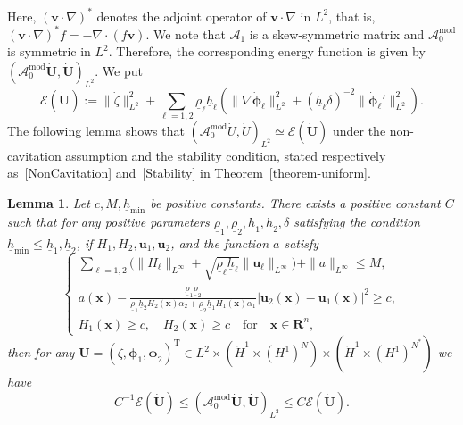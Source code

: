 \documentclass[11pt,leqno]{article}
\newtheorem{lemma}[theorem]{\bf Lemma}
\numberwithin{equation}{section}
\numberwithin{figure}{section}
\begin{document}
%
Here, $(\bm{v}\cdot\nabla)^*$ denotes the adjoint operator of $\bm{v}\cdot\nabla$ in $L^2$, that is, 
$(\bm{v}\cdot\nabla)^*f=-\nabla\cdot(f\bm{v})$. 
We note that $\mathscr{A}_1$ is a skew-symmetric matrix and $\mathscr{A}_0^\mathrm{mod}$ is symmetric in $L^2$. 
Therefore, the corresponding energy function is given by 
$(\mathscr{A}_0^\mathrm{mod}\dot{\bm{U}},\dot{\bm{U}})_{L^2}$. 
We put 
%
\begin{equation}\label{def-E}
\mathscr{E}(\dot{\bm{U}}) := \|\dot{\zeta}\|_{L^2}^2
 + \sum_{\ell=1,2}\underline{\rho}_\ell\underline{h}_\ell( \|\nabla\dot{\bm{\phi}}_\ell\|_{L^2}^2
  + (\underline{h}_\ell\delta)^{-2}\|\dot{\bm{\phi}}_\ell'\|_{L^2}^2 ).
\end{equation}
%
The following lemma shows that $(\mathscr{A}_0^\mathrm{mod}\dot{U},\dot{U})_{L^2} \simeq \mathscr{E}(\dot{\bm{U}})$ 
under
the non-cavitation assumption and the stability condition, 
stated respectively as~\eqref{NonCavitation} and~\eqref{Stability} in Theorem~\ref{theorem-uniform}. 


\begin{lemma}\label{L.A0-coercive}
Let $c, M, \underline{h}_\mathrm{min}$ be positive constants. 
There exists a positive constant $C$ such that for any positive parameters 
$\underline{\rho}_1,\underline{\rho}_2,\underline{h}_1,\underline{h}_2,\delta$ satisfying the condition 
$\underline{h}_\mathrm{min} \leq \underline{h}_1,\underline{h}_2$, if $H_1,H_2,\bm{u}_1,\bm{u}_2$, and the function $a$ satisfy 
%
\begin{equation}\label{conditions-linear1}
\begin{cases}
 \displaystyle
 \sum_{\ell=1,2}\bigl( \|H_\ell\|_{L^\infty} + \sqrt{ \underline{\rho}_\ell\underline{h}_\ell }
  \|\bm{u}_\ell\|_{L^\infty} \bigr) + \|a\|_{L^\infty} \leq M, \\
 \displaystyle
 a(\bm{x}) - \frac{ \underline{\rho}_1\underline{\rho}_2 }{ \underline{\rho}_1\underline{h}_2H_2(\bm{x})\alpha_2
  + \underline{\rho}_2\underline{h}_1H_1(\bm{x})\alpha_1 }|\bm{u}_2(\bm{x})-\bm{u}_1(\bm{x})|^2 \geq c, \\
 H_1(\bm{x}) \geq c, \quad H_2(\bm{x}) \geq c \quad\mbox{for}\quad \bm{x}\in\mathbf{R}^n,
\end{cases}
\end{equation}
%
then for any $\dot{\bm{U}} = (\dot{\zeta},\dot{\bm{\phi}}_1,\dot{\bm{\phi}}_2)^\mathrm{T} \in 
L^2\times(\mathring{H}^1\times(H^1)^N)\times(\mathring{H}^1\times(H^1)^{N^*})$ we have 
%
\[
C^{-1}\mathscr{E}(\dot{\bm{U}}) \leq (\mathscr{A}_0^\mathrm{mod}\dot{\bm{U}},\dot{\bm{U}})_{L^2}
\leq C\mathscr{E}(\dot{\bm{U}}). 
\]
\end{lemma}
\end{document}
